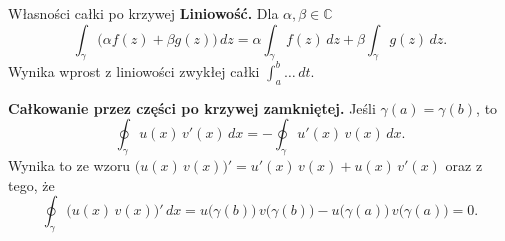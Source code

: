 \documentclass[11pt,aspectratio=169]{beamer}
\begin{document}
\begin{frame}{Własności całki po krzywej}
  \textbf{Liniowość.} Dla $\alpha, \beta \in \mathbb{C}$
  \[
    \int_{\gamma} \bigl(\alpha f(z) + \beta g(z)\bigr)\, dz = \alpha \int_{\gamma} f(z)\, dz + \beta \int_{\gamma} g(z)\, dz .
  \]
  Wynika wprost z liniowości zwykłej całki $\int_{a}^{b} \dots\, dt$.
  \pause
  \bigskip

  \textbf{Całkowanie przez części po krzywej zamkniętej.} Jeśli $\gamma(a) = \gamma(b)$, to
  \[
    \oint_{\gamma} u(x)\, v'(x)\, dx = - \oint_{\gamma} u'(x)\, v(x)\, dx .
  \]
  Wynika to ze wzoru $\bigl(u(x)\, v(x)\bigr)' = u'(x)\, v(x) + u(x)\, v'(x)$ oraz z tego, że
  \[
    \oint_{\gamma} \bigl(u(x)\, v(x)\bigr)'\, dx = u\bigl(\gamma(b)\bigr)\, v\bigl(\gamma(b)\bigr) - u\bigl(\gamma(a)\bigr)\, v\bigl(\gamma(a)\bigr) = 0 .
  \]
\end{frame}
\end{document}

